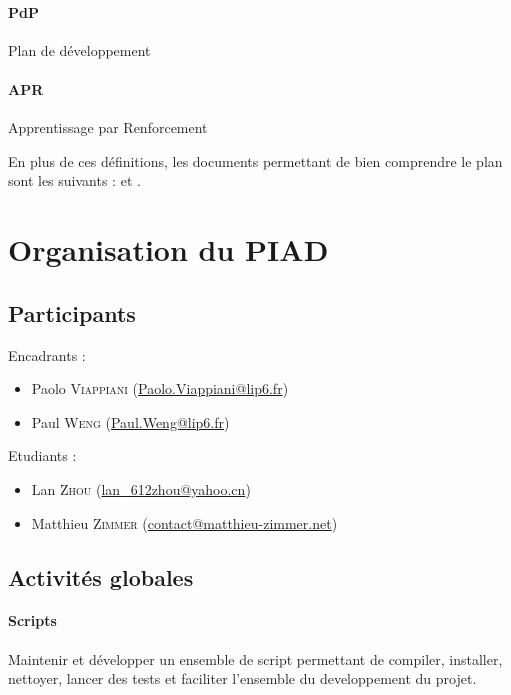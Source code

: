 \documentclass[a4paper,12pt]{article}
\begin{document}
   \paragraph{PdP} Plan de développement
   
   \paragraph{APR} Apprentissage par Renforcement
   
  \bigskip
  En plus de ces définitions, les documents permettant de bien 
    comprendre le plan sont les suivants : \cite{PDMIA} et \cite{ReinforceLearningIntro}.
  
  \newpage 
  \section{Organisation du PIAD}

    \subsection{Participants}
	Encadrants :
	\begin{itemize}
		\item Paolo \textsc{Viappiani} (\href{mailto:Paolo.Viappiani@lip6.fr}{Paolo.Viappiani@lip6.fr})
		\item Paul \textsc{Weng} (\href{mailto:Paul.Weng@lip6.fr }{Paul.Weng@lip6.fr})
	\end{itemize}

	\bigskip
	Etudiants :
	\begin{itemize}
		\item Lan \textsc{Zhou} (\href{mailto:lan\_612zhou@yahoo.cn}{lan\_612zhou@yahoo.cn})
		\item Matthieu \textsc{Zimmer} (\href{mailto:contact@matthieu-zimmer.net}{contact@matthieu-zimmer.net})
	\end{itemize}

    
    \subsection{Activités globales}
      \paragraph{Scripts} Maintenir et développer un ensemble de script permettant de compiler, installer, nettoyer, lancer
      des tests et faciliter l'ensemble du developpement du projet.
     
\end{document}
